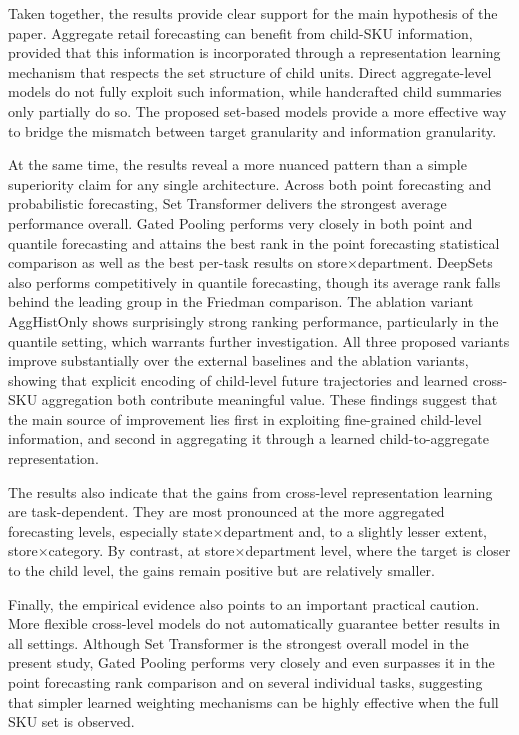 \documentclass[12pt]{article}
\begin{document}
Taken together, the results provide clear support for the main hypothesis of the paper. Aggregate retail forecasting can benefit from child-SKU information, provided that this information is incorporated through a representation learning mechanism that respects the set structure of child units. Direct aggregate-level models do not fully exploit such information, while handcrafted child summaries only partially do so. The proposed set-based models provide a more effective way to bridge the mismatch between target granularity and information granularity.

At the same time, the results reveal a more nuanced pattern than a simple superiority claim for any single architecture. Across both point forecasting and probabilistic forecasting, Set Transformer delivers the strongest average performance overall. Gated Pooling performs very closely in both point and quantile forecasting and attains the best rank in the point forecasting statistical comparison as well as the best per-task results on store$\times$department. DeepSets also performs competitively in quantile forecasting, though its average rank falls behind the leading group in the Friedman comparison. The ablation variant AggHistOnly shows surprisingly strong ranking performance, particularly in the quantile setting, which warrants further investigation. All three proposed variants improve substantially over the external baselines and the ablation variants, showing that explicit encoding of child-level future trajectories and learned cross-SKU aggregation both contribute meaningful value. These findings suggest that the main source of improvement lies first in exploiting fine-grained child-level information, and second in aggregating it through a learned child-to-aggregate representation.

The results also indicate that the gains from cross-level representation learning are task-dependent. They are most pronounced at the more aggregated forecasting levels, especially state$\times$department and, to a slightly lesser extent, store$\times$category. By contrast, at store$\times$department level, where the target is closer to the child level, the gains remain positive but are relatively smaller.

Finally, the empirical evidence also points to an important practical caution. More flexible cross-level models do not automatically guarantee better results in all settings. Although Set Transformer is the strongest overall model in the present study, Gated Pooling performs very closely and even surpasses it in the point forecasting rank comparison and on several individual tasks, suggesting that simpler learned weighting mechanisms can be highly effective when the full SKU set is observed. 
\end{document}
